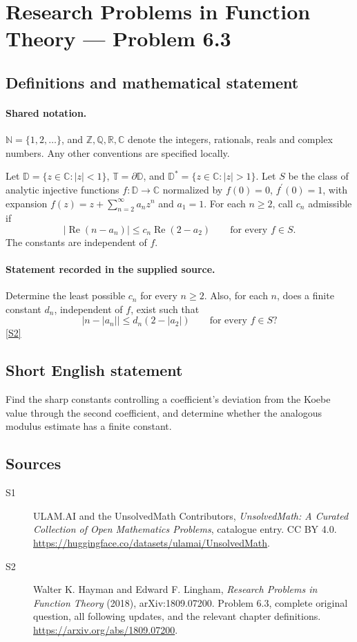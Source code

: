\documentclass[11pt]{book}
\newcommand{\sref}[2]{\hyperlink{source:#1:#2}{[S#2]}}
\begin{document}
\section{Research Problems in Function Theory — Problem 6.3}\label{statement}

\subsection{Definitions and mathematical statement}

\paragraph{Shared notation.}$\mathbb N=\{1,2,\ldots\}$, and $\mathbb Z,\mathbb Q,\mathbb R,\mathbb C$ denote the integers, rationals, reals and complex numbers. Any other conventions are specified locally.


Let $\mathbb D=\{z\in\mathbb C:|z|<1\}$, $\mathbb T=\partial\mathbb D$, and $\mathbb D^*=\{z\in\mathbb C:|z|>1\}$. Let $S$ be the class of analytic injective functions $f:\mathbb D\to\mathbb C$ normalized by $f(0)=0$, $f^{\prime}(0)=1$, with expansion $f(z)=z+\sum_{n=2}^{\infty}a_nz^n$ and $a_1=1$. For each $n\ge2$, call $c_n$ admissible if \[|\operatorname{Re}(n-a_n)|\le c_n\operatorname{Re}(2-a_2)\qquad\text{for every }f\in S.\] The constants are independent of $f$.
\paragraph{Statement recorded in the supplied source.}
Determine the least possible $c_n$ for every $n\ge2$. Also, for each $n$, does a finite constant $d_n$, independent of $f$, exist such that \[\big|n-|a_n|\big|\le d_n(2-|a_2|)\qquad\text{for every }f\in S?\] \sref{statement}{2}
\subsection{Short English statement}
Find the sharp constants controlling a coefficient’s deviation from the Koebe value through the second coefficient, and determine whether the analogous modulus estimate has a finite constant.
\subsection{Sources}
\begin{description}
\item[\hypertarget{source:statement:1}{S1}] ULAM.AI and the UnsolvedMath Contributors, \emph{UnsolvedMath: A Curated Collection of Open Mathematics Problems}, catalogue entry. CC BY 4.0. \url{https://huggingface.co/datasets/ulamai/UnsolvedMath}.
\item[\hypertarget{source:statement:2}{S2}] Walter K. Hayman and Edward F. Lingham, \emph{Research Problems in Function Theory} (2018), arXiv:1809.07200. Problem 6.3, complete original question, all following updates, and the relevant chapter definitions. \url{https://arxiv.org/abs/1809.07200}.
\end{description}
\label{end:statement}
\end{document}
